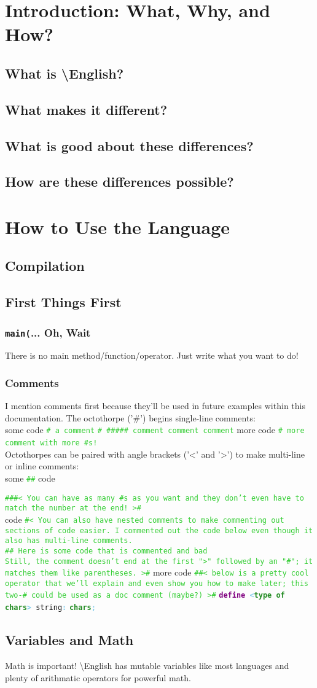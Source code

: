 \documentclass{article}
\newcommand{\English}{\textbackslash{}English}				%
\newcommand{\secl}[1]{\section{#1}\label{sec:#1}}
\newcommand{\ssecl}[1]{\subsection{#1}\label{ssec:#1}}
\newcommand{\sssecl}[1]{\subsubsection{#1}\label{sssec:#1}}
\newcommand{\codecomment}[1]{\texttt{\textcolor{LimeGreen}{#1}}}
\newcommand{\commentline}[1]{\codecomment{\# #1}}
\newcommand{\type}[1]{\texttt{\textcolor{ForestGreen}{\textbf{#1}}}}
\newcommand{\keyop}[1]{\texttt{\textcolor{Purple}{\textbf{#1}}}}
\newcommand{\defpunct}[1]{\texttt{\textcolor{SkyBlue}{\textbf{#1}}}}
\newcommand{\define}[2]{\texttt{\keyop{define} \defpunct{<}#1\defpunct{>} #2\defpunct{:}}}
\newenvironment{code}[0]
{\ttfamily{}				%
\setlength\parindent{0cm}	%
~\\}
{\setlength\parindent{1cm}
~\\}
\begin{document}
\setlength\parindent{1cm}								%

\tableofcontents
\newpage

\obeylines												%

\secl{Introduction: What, Why, and How?}
\ssecl{What is \English{}?}

\ssecl{What makes it different?}

\ssecl{What is good about these differences?}

\ssecl{How are these differences possible?}

\secl{How to Use the Language}
\ssecl{Compilation}

\ssecl{First Things First}
\sssecl{\texttt{main(}... Oh, Wait}
\indent There is no main method/function/operator. Just write what you want to do!
\sssecl{Comments}
\indent I mention comments first because they'll be used in future examples within this documentation.
\indent The octothorpe ('\#') begins single-line comments:
\begin{code}
some code		\commentline{a comment}
\commentline{\#\#\#\#\# comment comment comment}
more code		\commentline{more comment with more \#s!}
\end{code}
\indent Octothorpes can be paired with angle brackets ('<' and '>') to make multi-line or inline comments:
\begin{code}
some \codecomment{\#< awesome >\#} code

\codecomment{\#\#\#< You can have as many \#s as you want and they don't
even have to match the number at the end! >\#\\}
code
\codecomment{\#< You can also have nested comments to make commenting out sections of code easier. 
I commented out the code below even though it also has multi-line comments.\\

\#< This is a comment >\# Here is some code that is commented and bad\\

Still, the comment doesn't end at the first ">" followed by an "\#"; it matches them like parentheses. 
>\#}
more code
\codecomment{\#\#< below is a pretty cool operator that we'll explain and even show you how to make later; this two-\# could be used as a doc comment (maybe?) >\#}
\define{\type{type of chars}}{string}
\qquad\type{chars}\defpunct{;}
\end{code}

\ssecl{Variables and Math}
\indent Math is important! \English{} has mutable variables like most languages and plenty of arithmatic operators for powerful math.
\end{document}
